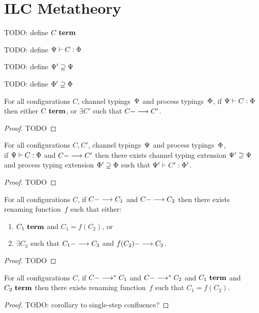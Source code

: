 \section{ILC Metatheory}
\label{sec:metatheory}

TODO: define $C~\textbf{term}$

TODO: define $\Psi |- C : \Phi$

TODO: define $\Psi' \supseteq \Psi$

TODO: define $\Phi' \supseteq \Phi$


\begin{theorem}[Progress]
For all configurations $C$,
channel typings~$\Psi$
and process typings~$\Phi$,
%
if $\Psi |- C : \Phi$
then 
either $C~\textbf{term}$,
or $\exists C'$ such that $C ---> C'$.
\begin{proof}
  TODO
\end{proof}
\end{theorem}

\begin{theorem}[Preservation]
For all configurations $C, C'$,
channel typings~$\Psi$
and process typings~$\Phi$,
\\
%
 if $\Psi |- C : \Phi$
and $C ---> C'$ 
then there exists 
channel typing extension $\Psi' \supseteq \Psi$
and process typing extension $\Phi' \supseteq \Phi$
such that $\Psi' |- C' : \Phi'$.
\begin{proof}
  TODO
\end{proof}
\end{theorem}

\begin{theorem}
For all configurations $C$,
%
 if $C ---> C_1$ 
and $C ---> C_2$ 
then 
there exists renaming function~$f$ 
such that either:
\begin{enumerate}
\item $C_1~\textbf{term}$ and $C_1 = f(C_2)$, or
\item $\exists C_3$ 
such that $C_1 ---> C_3$ and $f(C_2) ---> C_3$.
\end{enumerate}
\begin{proof}
  TODO
\end{proof}
\end{theorem}

\begin{theorem}
For all configurations $C$,
%
 if $C --->^\ast C_1$ 
and $C --->^\ast C_2$ 
and $C_1~\textbf{term}$
and $C_2~\textbf{term}$
then 
there exists renaming function~$f$ 
such that $C_1 = f(C_2)$.
\begin{proof}
  TODO: corollary to single-step confluence?
\end{proof}
\end{theorem}
